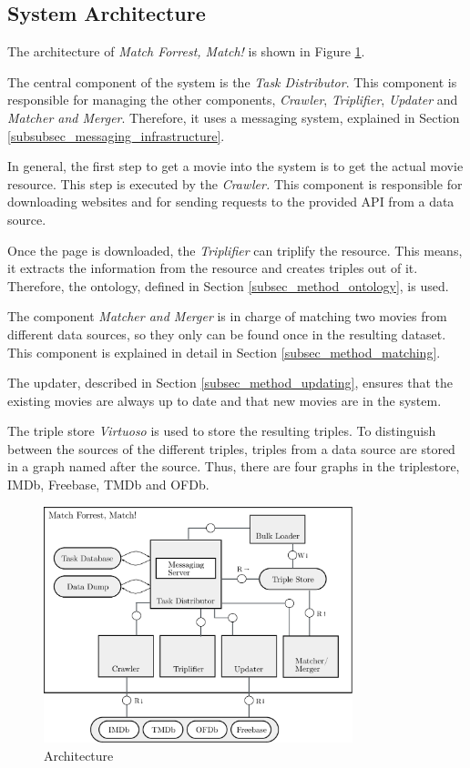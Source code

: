 \subsection{System Architecture}
\label{subsec_method_architecture}

The architecture of \emph{Match Forrest, Match!} is shown in Figure \ref{fig_architecture}.

The central component of the system is the \textit{Task Distributor}.
This component is responsible for managing the other components, \textit{Crawler}, \textit{Triplifier}, \textit{Updater} and \textit{Matcher and Merger}.
Therefore, it uses a messaging system, explained in Section \ref{subsubsec_messaging_infrastructure}.

In general, the first step to get a movie into the system is to get the actual movie resource.
This step is executed by the \textit{Crawler.}
This component is responsible for downloading websites and for sending requests to the provided API from a data source.

Once the page is downloaded, the \textit{Triplifier} can triplify the resource.
This means, it extracts the information from the resource and creates triples out of it.
Therefore, the ontology, defined in Section \ref{subsec_method_ontology}, is used.

The component \textit{Matcher and Merger} is in charge of matching two movies from different data sources, so they only can be found once in the resulting dataset.
This component is explained in detail in Section \ref{subsec_method_matching}.

The updater, described in Section \ref{subsec_method_updating}, ensures that the existing movies are always up to date and that new movies are in the system.

The triple store \textit{Virtuoso} is used to store the resulting triples.
To distinguish between the sources of the different triples, triples from a data source are stored in a graph named after the source.
Thus, there are four graphs in the triplestore, IMDb, Freebase, TMDb and OFDb.

\begin{figure}[ht]
  \begin{center}
  \includegraphics[width=0.8\textwidth]{images/architecture.pdf}
  \end{center}
  \caption{Architecture}
  \label{fig_architecture}
\end{figure}

